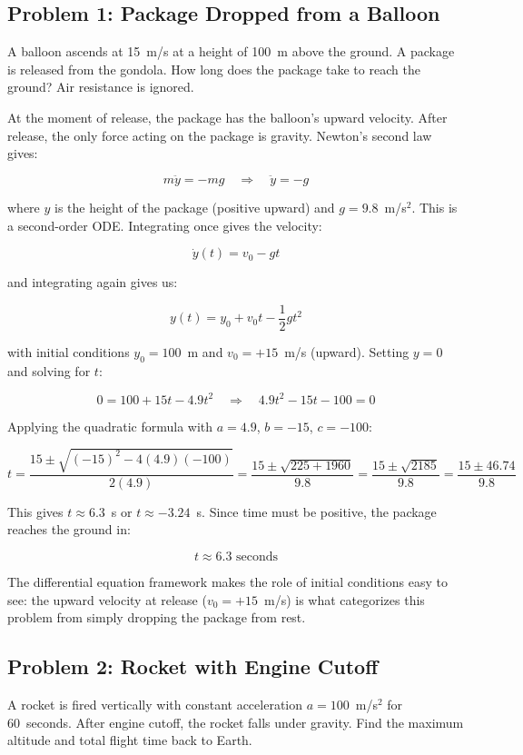 \documentclass[12pt]{article}
\begin{document}
\subsection{Problem 1: Package Dropped from a Balloon}

A balloon ascends at 15~m/s at a height of 100~m above the ground. A package is released from
the gondola. How long does the package take to reach the ground? Air resistance is ignored.

At the moment of release, the package has the balloon's upward velocity. After release, the
only force acting on the package is gravity. Newton's second law gives:

\[
    m\ddot{y} = -mg \quad \Longrightarrow \quad \ddot{y} = -g
\]

where $y$ is the height of the package (positive upward) and $g = 9.8$~m/s$^2$. This is a
second-order ODE. Integrating once gives the velocity:

\[
    \dot{y}(t) = v_0 - gt
\]

and integrating again gives us:

\[
    y(t) = y_0 + v_0 t - \frac{1}{2}g t^2
\]

with initial conditions $y_0 = 100$~m and $v_0 = +15$~m/s (upward). Setting $y = 0$ and
solving for $t$:

\[
    0 = 100 + 15t - 4.9t^2 \quad \Longrightarrow \quad 4.9t^2 - 15t - 100 = 0
\]

Applying the quadratic formula with $a = 4.9$, $b = -15$, $c = -100$:

\[
    t = \frac{15 \pm \sqrt{(-15)^2 - 4(4.9)(-100)}}{2(4.9)}
    = \frac{15 \pm \sqrt{225 + 1960}}{9.8}
    = \frac{15 \pm \sqrt{2185}}{9.8}
    = \frac{15 \pm 46.74}{9.8}
\]

This gives $t \approx 6.3$~s or $t \approx -3.24$~s. Since time must be positive, the package
reaches the ground in:

\[
    \boxed{t \approx 6.3 \text{ seconds}}
\]

The differential equation framework makes the role of initial conditions easy to see: the upward
velocity at release ($v_0 = +15$~m/s) is what categorizes this problem from simply dropping
the package from rest.

\subsection{Problem 2: Rocket with Engine Cutoff}

A rocket is fired vertically with constant acceleration $a = 100$~m/s$^2$ for 60~seconds.
After engine cutoff, the rocket falls under gravity. Find the maximum altitude and total
flight time back to Earth.
\end{document}
